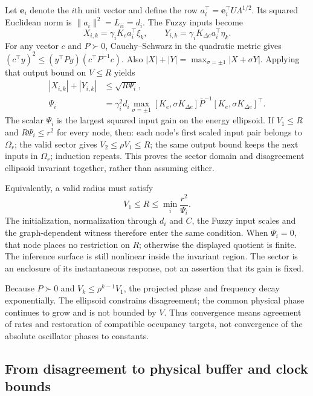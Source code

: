 Let $\mathbf e_i$ denote the $i$th unit vector and define the row
$a_i^\top=\mathbf e_i^\top U\Lambda^{1/2}$. Its squared Euclidean norm
is $\|a_i\|^2=L_{ii}=d_i$. The Fuzzy inputs become
\begin{equation}
 X_{i,k}=\gamma_iK_ea_i^\top\xi_k,\qquad
 Y_{i,k}=\gamma_iK_{\Delta e}a_i^\top\eta_k.
 \label{detail:eq:btd_d_linear_outputs}
\end{equation}
For any vector $c$ and $P\succ0$, Cauchy--Schwarz in the quadratic
metric gives $(c^\top y)^2\le(y^\top P y)(c^\top P^{-1}c)$.
Also $|X|+|Y|=\max_{\sigma=\pm1}|X+\sigma Y|$. Applying that output
bound on $V\le R$ yields
\begin{align}
 |X_{i,k}|+|Y_{i,k}|&\le\sqrt{R\Psi_i},\nonumber\\
 \Psi_i&=\gamma_i^2d_i\max_{\sigma=\pm1}
 [K_e,\sigma K_{\Delta e}]\bar P^{-1}
 [K_e,\sigma K_{\Delta e}]^\top.
 \label{detail:eq:btd_input_factor}
\end{align}
The scalar $\Psi_i$ is the largest squared input gain on the energy
ellipsoid. If $V_1\le R$ and $R\Psi_i\le r^2$ for every node, then:
each node's first scaled input pair belongs to $\Omega_r$; the valid sector gives
$V_2\le\rho V_1\le R$; the same output bound keeps the next inputs in
$\Omega_r$; induction repeats. This proves the sector domain and
disagreement ellipsoid invariant together, rather than assuming either.

Equivalently, a valid radius must satisfy
\begin{equation}
 V_1\le R\le\min_i\frac{r^2}{\Psi_i}.
 \label{detail:eq:btd_sector_radius_condition}
\end{equation}
The initialization, normalization through $d_i$ and $C$, the Fuzzy input
scales and the graph-dependent witness therefore enter the same
condition. When $\Psi_i=0$, that node places no restriction on $R$;
otherwise the displayed quotient is finite. The inference surface is
still nonlinear inside the invariant region. The sector is an enclosure
of its instantaneous response, not an assertion that its gain is fixed.

Because $P\succ0$ and $V_k\le\rho^{k-1}V_1$, the projected phase and
frequency decay exponentially. The ellipsoid constrains disagreement;
the common physical phase continues to grow and is not bounded by $V$.
Thus convergence means agreement of rates and restoration of compatible
occupancy targets, not convergence of the absolute oscillator phases to constants.

\subsection{From disagreement to physical buffer and clock bounds}

